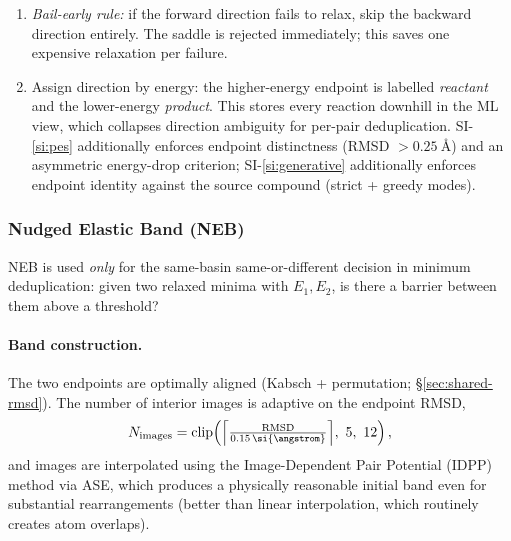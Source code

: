\begin{enumerate}
    \item \emph{Bail-early rule:} if the forward direction fails to relax, skip the backward direction entirely. The saddle is rejected immediately; this saves one expensive relaxation per failure.

    \item Assign direction by energy: the higher-energy endpoint is labelled \emph{reactant} and the lower-energy \emph{product}. This stores every reaction downhill in the ML view, which collapses direction ambiguity for per-pair deduplication. SI-\ref{si:pes} additionally enforces endpoint distinctness (RMSD $> \SI{0.25}{\angstrom}$) and an asymmetric energy-drop criterion; SI-\ref{si:generative} additionally enforces endpoint identity against the source compound (strict + greedy modes).
\end{enumerate}


\subsubsection{Nudged Elastic Band (NEB)}
\label{sec:shared-neb}

NEB \citep{henkelman2000climbing} is used \emph{only} for the same-basin same-or-different decision in minimum deduplication: given two relaxed minima with $E_1, E_2$, is there a barrier between them above a threshold?

\paragraph{Band construction.}
The two endpoints are optimally aligned (Kabsch + permutation; \S\ref{sec:shared-rmsd}). The number of interior images is adaptive on the endpoint RMSD,
\begin{equation}
    N_\text{images} = \mathrm{clip}\!\left(\Bigl\lceil \tfrac{\text{RMSD}}{0.15\,\si{\angstrom}} \Bigr\rceil,\ 5,\ 12\right),
\end{equation}
and images are interpolated using the Image-Dependent Pair Potential (IDPP) method via ASE, which produces a physically reasonable initial band even for substantial rearrangements (better than linear interpolation, which routinely creates atom overlaps).

